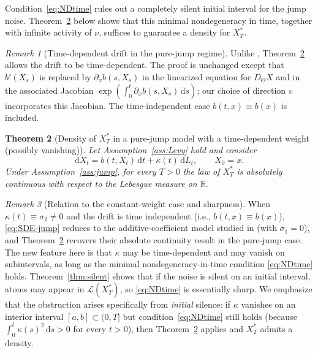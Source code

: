 \documentclass[11pt]{article}
\newcommand{\R}{\mathbb{R}}
\newcommand{\1}{\mathbf{1}}
\newcommand{\law}{\mathcal{L}}
\newcommand{\dd}{\mathrm{d}}
\newcommand{\dt}{\,\dd t}
\newcommand{\Xstar}{X^{\ast}}
\theoremstyle{plain}
\newtheorem{theorem}{Theorem}[section]
\theoremstyle{definition}
\theoremstyle{remark}
\newtheorem{remark}[theorem]{Remark}
\begin{document}
Condition~\eqref{eq:NDtime} rules out a completely silent initial interval for the jump noise.
Theorem~\ref{thm:jump} below shows that this minimal nondegeneracy in time, together with infinite activity of $\nu$, suffices to guarantee a density for $\Xstar_T$.

\begin{remark}[Time-dependent drift in the pure-jump regime]
Unlike \cite{NakagawaSuzuki2024}, Theorem~\ref{thm:jump} allows the drift to be time-dependent.
The proof is unchanged except that $b'(X_s)$ is replaced by $\partial_x b(s,X_s)$ in the linearized equation for $D_\Theta X$
and in the associated Jacobian $\exp(\int_0^t \partial_x b(s,X_s)\,\dd s)$; our choice of direction $v$ incorporates this Jacobian.
The time-independent case $b(t,x)\equiv b(x)$ is included.
\end{remark}

\begin{theorem}[Density of $\Xstar_T$ in a pure-jump model with a time-dependent weight (possibly vanishing)]\label{thm:jump}
Let Assumption~\ref{ass:Levy} hold and consider
\begin{equation}\label{eq:SDE-jump}
\dd X_t=b(t,X_t)\dt+\kappa(t)\,\dd L_t,\qquad X_0=x.
\end{equation}
Under Assumption~\ref{ass:jump}, for every $T>0$ the law of $\Xstar_T$ is absolutely continuous with respect to the Lebesgue measure on $\R$.
\end{theorem}

\begin{remark}[Relation to the constant-weight case and sharpness]
When $\kappa(t)\equiv \sigma_2\neq 0$ and the drift is time independent (i.e., $b(t,x)\equiv b(x)$), \eqref{eq:SDE-jump} reduces to the additive-coefficient model studied in \cite{NakagawaSuzuki2024}
(with $\sigma_1=0$), and Theorem~\ref{thm:jump} recovers their absolute continuity result in the pure-jump case.
The new feature here is that $\kappa$ may be time-dependent and may vanish on subintervals, as long as the minimal
nondegeneracy-in-time condition \eqref{eq:NDtime} holds.
Theorem~\ref{thm:silent} shows that if the noise is silent on an initial interval, atoms may appear in $\law(\Xstar_T)$,
so \eqref{eq:NDtime} is essentially sharp.
We emphasize that the obstruction arises specifically from \emph{initial} silence: if $\kappa$ vanishes on an interior interval $[a,b]\subset(0,T]$ but condition~\eqref{eq:NDtime} still holds (because $\int_0^t\kappa(s)^2\,\dd s>0$ for every $t>0$), then Theorem~\ref{thm:jump} applies and $\Xstar_T$ admits a density.
\end{remark}
\end{document}
